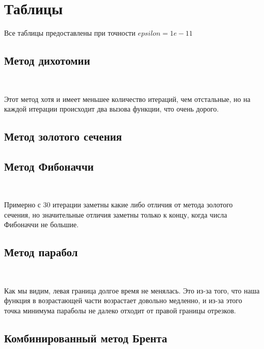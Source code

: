 \section {Таблицы}
	Все таблицы предоставлены при точности $epsilon = 1e\!\!-\!\!11$
\subsection {Метод дихотомии}


\ 

Этот метод хотя и имеет меньшее количество итераций, чем отстальные,
но на каждой итерации происходит два вызова функции, что очень дорого.

\subsection {Метод золотого сечения}


\subsection {Метод Фибоначчи}


\ 

Примерно с 30 итерации заметны какие либо отличия от метода золотого сечения, 
но значительные отличия заметны только к концу, когда числа 
Фибоначчи не большие.

\subsection {Метод парабол}


\ 

Как мы видим, левая граница долгое время не менялась.
Это из-за того, что наша функция в возрастающей части
возрастает довольно медленно, и из-за этого точка минимума параболы
не далеко отходит от правой границы отрезков.

\subsection {Комбинированный метод Брента}

